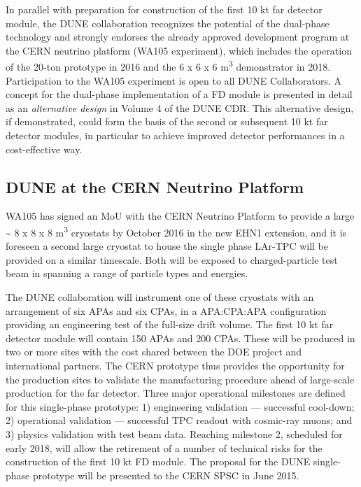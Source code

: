 In parallel with preparation for construction of the first 10 kt far detector module, 
the DUNE collaboration recognizes the potential of the dual-phase technology and 
strongly endorses the already approved development program at the CERN neutrino 
platform (WA105 experiment), which includes the operation of the 20-ton prototype 
in 2016 and the 6 x 6 x 6 m\textsuperscript{3} demonstrator in 2018. Participation 
to the WA105 experiment is open to all DUNE Collaborators. A concept for the dual-phase 
implementation of a FD module is presented in detail as an \textit{alternative 
design} in Volume 4 of the DUNE CDR. This alternative design, if demonstrated, 
could form the basis of the second or subsequent 10 kt far detector modules, in 
particular to achieve improved detector performances in a cost-effective way. 

\subsection{DUNE at the CERN Neutrino Platform}

WA105 has signed an MoU with the CERN Neutrino Platform to provide a large \textasciitilde{} 
8 x 8 x 8 m\textsuperscript{3} cryostats by October 2016 in the new EHN1 extension, 
and it is foreseen a second large cryostat to house the single phase LAr-TPC will 
be provided on a similar timescale. Both will be exposed to charged-particle test 
beam in spanning a range of particle types and energies.   

The DUNE collaboration will instrument one of these cryostats with an arrangement 
of six APAs and six CPAs, in a APA:CPA:APA configuration providing an engineering 
test of the full-size drift volume. The first 10 kt far detector module will contain 
150 APAs and 200 CPAs. These will be produced in two or more sites with the cost 
shared between the DOE project and international partners. The CERN prototype thus 
provides the opportunity for the production sites to validate the manufacturing 
procedure ahead of large-scale production for the far detector. Three major operational 
milestones are defined for this single-phase prototype: 1) engineering validation 
--- successful cool-down; 2) operational validation --- successful TPC readout with 
cosmic-ray muons; and 3) physics validation with test beam data. Reaching milestone 
2, scheduled for early 2018, will allow the retirement of a number of technical 
risks for the construction of the first 10 kt FD module. The proposal for the DUNE 
single-phase prototype will be presented to the CERN SPSC in June 2015.

